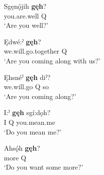 \ea
\label{ex:gpar46}
\gll Sgęnǫ́jih \textbf{gęh}?\\
you.are.well Q\\
\glt ‘Are you well?’
\z


\ea
\label{ex:gpar47}
\gll Ędwé:ˀ \textbf{gęh}?\\
we.will.go.together Q\\
\glt ‘Are you coming along with us?’
\z


\ea
\label{ex:gpar48}
\gll Ęhsnéˀ \textbf{gęh} diˀ?\\
we.will.go Q so\\
\glt ‘Are you coming along?’
\z


\ea
\label{ex:gpar49}
\gll I:ˀ \textbf{gęh} sgí:dǫh?\\
I Q you.mean.me\\
\glt ‘Do you mean me?’
\z


\ea
\label{ex:gpar50}
\gll Ahsǫ́h \textbf{gęh}?\\
more Q\\
\glt ‘Do you want some more?’
\z


